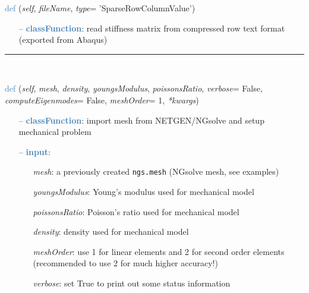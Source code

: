 \begin{itemize}[leftmargin=1.4cm]
\begin{itemize}[leftmargin=0.5cm]
\begin{itemize}[leftmargin=1.4cm]
\begin{itemize}[leftmargin=0.5cm]
\begin{flushleft}
\noindent \textcolor{steelblue}{def {\bf {}}}\label{sec:FEM:FEMinterface:ReadStiffnessMatrixFromAbaqus}
({\it self}, {\it fileName}, {\it type}= 'SparseRowColumnValue')
\end{flushleft}
\setlength{\itemindent}{0.7cm}
\begin{itemize}[leftmargin=0.7cm]
  \item[--]  \textcolor{steelblue}{\bf classFunction}: read stiffness matrix from compressed row text format (exported from Abaqus)\vspace{12pt}\end{itemize}
%
\noindent\rule{8cm}{0.75pt}\vspace{1pt} \\ 
\begin{flushleft}
\noindent \textcolor{steelblue}{def {\bf {}}}\label{sec:FEM:FEMinterface:ImportMeshFromNGsolve}
({\it self}, {\it mesh}, {\it density}, {\it youngsModulus}, {\it poissonsRatio}, {\it verbose}= False, {\it computeEigenmodes}= False, {\it meshOrder}= 1, {\it **kwargs})
\end{flushleft}
\setlength{\itemindent}{0.7cm}
\begin{itemize}[leftmargin=0.7cm]
  \item[--]  \textcolor{steelblue}{\bf classFunction}: import mesh from NETGEN/NGsolve and setup mechanical problem  \item[--]  \textcolor{steelblue}{\bf input}: \vspace{-6pt}
  \begin{itemize}[leftmargin=1.2cm]
\setlength{\itemindent}{-0.7cm}
    \item[] {\it mesh}: a previously created \texttt{ngs.mesh} (NGsolve mesh, see examples)
    \item[] {\it     youngsModulus}: Young's modulus used for mechanical model
    \item[] {\it     poissonsRatio}: Poisson's ratio used for mechanical model
    \item[] {\it     density}: density used for mechanical model
    \item[] {\it     meshOrder}: use 1 for linear elements and 2 for second order elements (recommended to use 2 for much higher accuracy!)
    \item[] {\it     verbose}: set True to print out some status information

\end{itemize}
\end{itemize}
\end{itemize}
\end{itemize}
\end{itemize}
\end{itemize}

